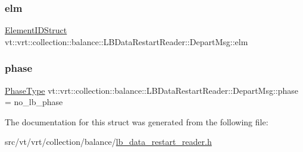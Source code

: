 \subsubsection{\texorpdfstring{elm}{elm}}
{\footnotesize\ttfamily \hyperlink{namespacevt_1_1vrt_1_1collection_1_1balance_a9f5b53fafb270212279a4757d2c4cd28}{Element\+I\+D\+Struct} vt\+::vrt\+::collection\+::balance\+::\+L\+B\+Data\+Restart\+Reader\+::\+Depart\+Msg\+::elm}

\mbox{\label{structvt_1_1vrt_1_1collection_1_1balance_1_1_l_b_data_restart_reader_1_1_depart_msg_a24a16bf35dbfd3e5e25e7d38736ac269}} 
\subsubsection{\texorpdfstring{phase}{phase}}
{\footnotesize\ttfamily \hyperlink{namespacevt_a46ce6733d5cdbd735d561b7b4029f6d7}{Phase\+Type} vt\+::vrt\+::collection\+::balance\+::\+L\+B\+Data\+Restart\+Reader\+::\+Depart\+Msg\+::phase = no\+\_\+lb\+\_\+phase}



The documentation for this struct was generated from the following file\+:\begin{DoxyCompactItemize}
\item 
src/vt/vrt/collection/balance/\hyperlink{lb__data__restart__reader_8h}{lb\+\_\+data\+\_\+restart\+\_\+reader.\+h}\end{DoxyCompactItemize}
